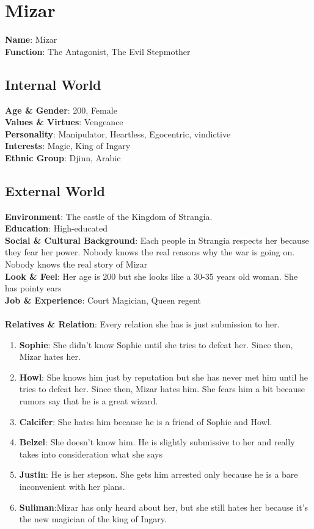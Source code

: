 \section{Mizar}

\textbf{Name}: Mizar\\
\textbf{Function}: The Antagonist, The Evil Stepmother

\subsection{Internal World}

\textbf{Age \& Gender}: 200, Female \\
\textbf{Values \& Virtues}: Vengeance \\
\textbf{Personality}: Manipulator, Heartless, Egocentric, vindictive \\
\textbf{Interests}: Magic, King of Ingary \\
\textbf{Ethnic Group}: Djinn, Arabic

\subsection{External World}
\textbf{Environment}: The castle of the Kingdom of Strangia. \\
\textbf{Education}: High-educated \\
\textbf{Social \& Cultural Background}: Each people in Strangia respects her because they fear her power. Nobody knows the real reasons why the war is going on. Nobody knows the real story of Mizar \\
\textbf{Look \& Feel}: Her age is 200 but she looks like a 30-35 years old woman. She has pointy ears  \\
\textbf{Job \& Experience}: Court Magician, Queen regent \\
\\
\textbf{Relatives \& Relation}: Every relation she has is just submission to her.
\begin{enumerate}
\item \textbf{Sophie}: She didn’t know Sophie until she tries to defeat her. Since then, Mizar hates her.
\item \textbf{Howl}: She knows him just by reputation but she has never met him until he tries to defeat her. Since then, Mizar hates him. She fears him a bit because rumors say that he is a great wizard.
\item \textbf{Calcifer}: She hates him because he is a friend of Sophie and Howl.
\item \textbf{Belzel}: She doesn’t know him. He is slightly submissive to her and really takes into consideration what she says
\item \textbf{Justin}: He is her stepson. She gets him arrested only because he is a bare  inconvenient with her plans. 
\item \textbf{Suliman}:Mizar has only heard about her, but she still hates her because it’s the new magician of the king of Ingary.
\end{enumerate}

